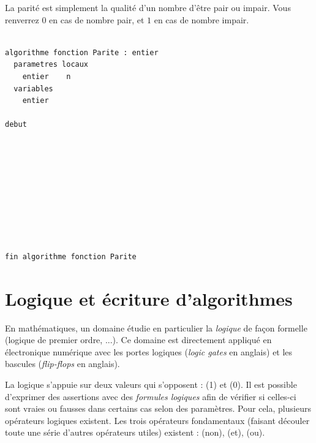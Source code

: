\documentclass[11pt,a4paper]{article}
\begin{document}
\vfillLast


\newpage


\vfillFirst


La parité est simplement la qualité d'un nombre d'être pair ou impair.
Vous renverrez $ 0 $ en cas de nombre pair, et $ 1 $ en cas de nombre impair.

\bigskip


\begin{center}

\begin{lstlisting}[style=algorithmique]

algorithme fonction Parite : entier
  parametres locaux
    entier    n
  variables
    entier

debut










fin algorithme fonction Parite
\end{lstlisting}

\end{center}


\vfillLast

\newpage


\section{Logique et écriture d'algorithmes}

\bigskip

En mathématiques, un domaine étudie en particulier la \textit{logique} de façon formelle (logique de premier ordre, ...).
Ce domaine est directement appliqué en électronique numérique avec les portes logiques (\textit{logic gates} en anglais) et les bascules (\textit{flip-flops} en anglais).

\medskip

La logique s'appuie sur deux valeurs qui s'opposent :  (1) et  (0).
Il est possible d'exprimer des assertions avec des \textit{formules logiques} afin de vérifier si celles-ci sont vraies ou fausses dans certains cas selon des paramètres.
Pour cela, plusieurs opérateurs logiques existent.
Les trois opérateurs fondamentaux (faisant découler toute une série d'autres opérateurs utiles) existent :  (non),  (et),  (ou).
\end{document}
